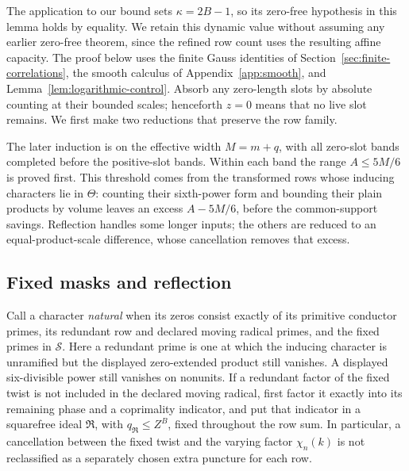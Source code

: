\documentclass[12pt]{article}
\begin{document}
The application to our bound sets \(\kappa=2B-1\), so
its zero-free hypothesis in this lemma holds by equality.  We retain this
dynamic value without assuming any earlier zero-free theorem,
since the refined row count uses the resulting affine
capacity.  The proof below uses the
finite Gauss identities of Section~\ref{sec:finite-correlations},
the smooth calculus of Appendix~\ref{app:smooth}, and Lemma~\ref{lem:logarithmic-control}.
Absorb any zero-length slots by absolute counting at their bounded
scales; henceforth \(z=0\) means that no live slot remains.  We first
make two reductions that preserve the row family.

The later induction is on the effective width \(M=m+q\), with all zero-slot
bands completed before the positive-slot bands.  Within each band the range
\(A\le5M/6\) is proved first.  This threshold comes from the
transformed rows whose inducing characters lie in \(\Theta\): counting
their sixth-power form and
bounding their plain products by volume leaves an excess
\(A-5M/6\), before the common-support savings.  Reflection handles
some longer inputs; the others are reduced to an equal-product-scale
difference, whose cancellation removes that excess.

\subsection{Fixed masks and reflection}

Call a character \emph{natural} when its zeros consist exactly of its
primitive conductor primes, its redundant row and declared moving
radical primes, and the fixed primes in \(\mathcal S\).  Here a
redundant prime is one at which the inducing character is unramified
but the displayed zero-extended product still vanishes.  A displayed
six-divisible power still vanishes on nonunits.  If a redundant factor
of the fixed twist is not included in the declared moving radical,
first factor it exactly into its remaining phase and a coprimality
indicator, and put that indicator in a squarefree ideal
\(\mathfrak R\), with \(q_{\mathfrak R}\le Z^B\), fixed throughout
the row sum.  In particular, a cancellation between the fixed twist
and the varying factor \(\chi_n(k)\) is not reclassified as a
separately chosen extra puncture for each row.
\end{document}
